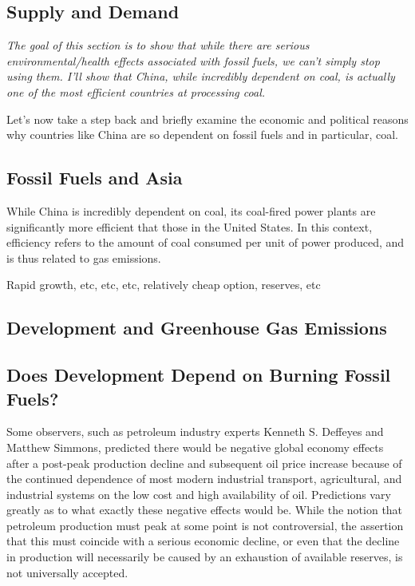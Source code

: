 \subsection{Supply and Demand}

\emph{The goal of this section is to show that while there are serious environmental/health effects associated with fossil fuels, we can't simply stop using them. I'll show that China, while incredibly dependent on coal, is actually one of the most efficient countries at processing coal. }

Let's now take a step back and briefly examine the economic and political reasons why countries like China are so dependent on fossil fuels and in particular, coal.  



\subsection{Fossil Fuels and Asia}

While China is incredibly dependent on coal, its coal-fired power plants are significantly more efficient that those in the United States. In this context, efficiency refers to the amount of coal consumed per unit of power produced, and is thus related to gas emissions. 

Rapid growth, etc, etc, etc, relatively cheap option, reserves, etc

\subsection{Development and Greenhouse Gas Emissions}

\subsection{Does Development Depend on Burning Fossil Fuels?}

Some observers, such as petroleum industry experts Kenneth S. Deffeyes and Matthew Simmons, predicted there would be negative global economy effects after a post-peak production decline and subsequent oil price increase because of the continued dependence of most modern industrial transport, agricultural, and industrial systems on the low cost and high availability of oil. Predictions vary greatly as to what exactly these negative effects would be. While the notion that petroleum production must peak at some point is not controversial, the assertion that this must coincide with a serious economic decline, or even that the decline in production will necessarily be caused by an exhaustion of available reserves, is not universally accepted.

